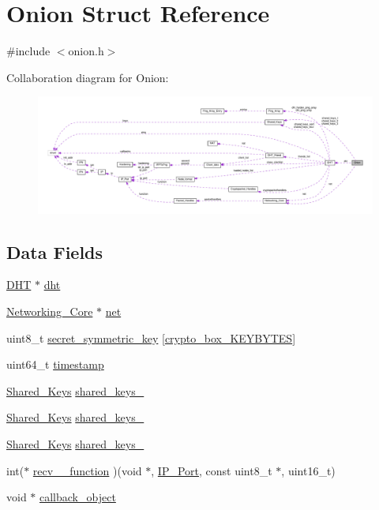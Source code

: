 \hypertarget{struct_onion}{\section{Onion Struct Reference}
\label{struct_onion}
}


{\ttfamily \#include $<$onion.\+h$>$}



Collaboration diagram for Onion\+:
\nopagebreak
\begin{figure}[H]
\begin{center}
\leavevmode
\includegraphics[width=350pt]{dc/dae/struct_onion__coll__graph}
\end{center}
\end{figure}
\subsection*{Data Fields}
\begin{DoxyCompactItemize}
\item 
\hyperlink{struct_d_h_t}{D\+H\+T} $\ast$ \hyperlink{struct_onion_a8b3d6ce8745acc52695e252bdb1531b6}{dht}
\item 
\hyperlink{struct_networking___core}{Networking\+\_\+\+Core} $\ast$ \hyperlink{struct_onion_aa14ea2f67950f57fe4235d7375a2216c}{net}
\item 
uint8\+\_\+t \hyperlink{struct_onion_ab9f2ff47bc0b1e5110202a6e4be86390}{secret\+\_\+symmetric\+\_\+key} \mbox{[}\hyperlink{crypto__core_8h_aade7cd33abc5668970c55ed009ab00c8}{crypto\+\_\+box\+\_\+\+K\+E\+Y\+B\+Y\+T\+E\+S}\mbox{]}
\item 
uint64\+\_\+t \hyperlink{struct_onion_a465bef81f6478756e5443025b1f2ddfa}{timestamp}
\item 
\hyperlink{struct_shared___keys}{Shared\+\_\+\+Keys} \hyperlink{struct_onion_a7dc1514173e0fd82d265ebc3a43090ea}{shared\+\_\+keys\+\_}
\item 
\hyperlink{struct_shared___keys}{Shared\+\_\+\+Keys} \hyperlink{struct_onion_a01ec0631137b85dd55bf0cbb3492e8f5}{shared\+\_\+keys\+\_}
\item 
\hyperlink{struct_shared___keys}{Shared\+\_\+\+Keys} \hyperlink{struct_onion_a2c2de8d3552fa4223cbf58557704b977}{shared\+\_\+keys\+\_}
\item 
int($\ast$ \hyperlink{struct_onion_a980753d0df6688333680e95f637eb7a7}{recv\+\_\+\_\+function} )(void $\ast$, \hyperlink{struct_i_p___port}{I\+P\+\_\+\+Port}, const uint8\+\_\+t $\ast$, uint16\+\_\+t)
\item 
void $\ast$ \hyperlink{struct_onion_aa30dff385b8f119ddb95900b2a250a08}{callback\+\_\+object}
\end{DoxyCompactItemize}


